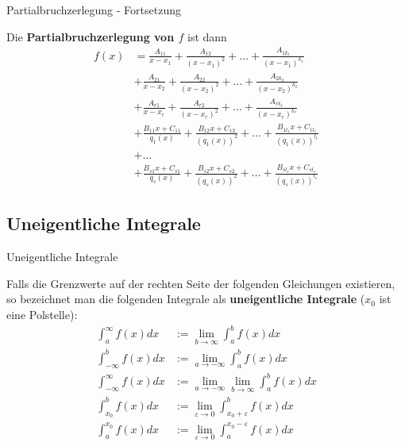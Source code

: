 \begin{frame}{Partialbruchzerlegung - Fortsetzung}
\begin{bemerkung}		
		Die \textbf{Partialbruchzerlegung von $f$} ist dann
		\begin{align*}
			f(x) & = \frac{A_{11}}{x-x_{1}} + \frac{A_{12}}{(x-x_{1})^{2}} + \ldots + \frac{A_{1k_{1}}}{(x-x_{1})^{k_{1}}}  \\
			& + \frac{A_{21}}{x-x_{2}} + \frac{A_{22}}{(x-x_{2})^{2}} + \ldots + \frac{A_{2k_{2}}}{(x-x_{2})^{k_{2}}}  \\
			& + \frac{A_{r1}}{x-x_{r}} + \frac{A_{r2}}{(x-x_{r})^{2}} + \ldots + \frac{A_{rk_{r}}}{(x-x_{r})^{k_{r}}}  \\
			& + \frac{B_{11}x+C_{11}}{q_{1}(x)} + \frac{B_{12}x+C_{12}}{(q_{1}(x))^{2}} + \ldots + \frac{B_{1l_{1}}x+C_{1l_{1}}}{(q_{1}(x))^{l_{1}}} \\
			& + \ldots \\
			& + \frac{B_{s1}x+C_{s1}}{q_{s}(x)} + \frac{B_{s2}x+C_{s2}}{(q_{s}(x))^{2}} + \ldots + \frac{B_{sl_{s}}x+C_{sl_{s}}}{(q_{s}(x))^{l_{s}}}
		\end{align*}
	\end{bemerkung}
\end{frame}

\subsection{Uneigentliche Integrale}
\begin{frame}{Uneigentliche Integrale}
	\begin{definition}
		Falls die Grenzwerte auf der rechten Seite der folgenden Gleichungen existieren, so bezeichnet man die folgenden Integrale als \textbf{uneigentliche Integrale} ($x_{0}$ ist eine Polstelle):
		\begin{align*}
			\int_{a}^{\infty} f(x) dx & := \lim_{b \to \infty} \int_{a}^{b}f(x) dx \\ 
			\int_{-\infty}^{b} f(x) dx & := \lim_{a \to -\infty} \int_{a}^{b}f(x) dx \\
			\int_{-\infty}^{\infty} f(x) dx & := \lim_{a \to -\infty} \lim_{b \to \infty} \int_{a}^{b}f(x) dx \\
			\int_{x_{0}}^{b} f(x) dx & := \lim_{\varepsilon \to 0} \int_{x_{0}+\varepsilon}^{b}f(x) dx \\
			\int_{a}^{x_{0}} f(x) dx & := \lim_{\varepsilon \to 0} \int_{a}^{x_{0}-\varepsilon}f(x) dx 
		\end{align*}	
	\end{definition}
\end{frame}

